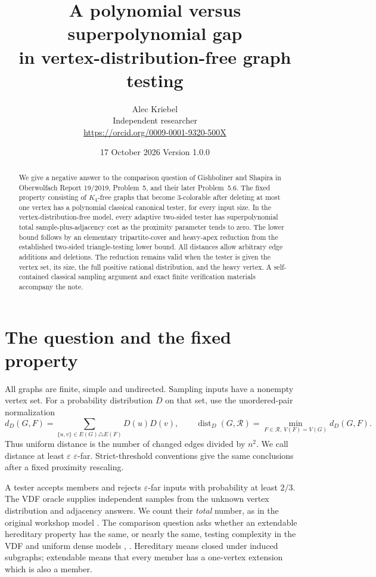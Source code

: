 \documentclass[11pt]{article}
\title{A polynomial versus superpolynomial gap\\in vertex-distribution-free graph testing}
\author{Alec Kriebel\\{\small Independent researcher}\\
{\small\url{https://orcid.org/0009-0001-9320-500X}}}
\date{17 October 2026 \quad Version 1.0.0}
\newcommand{\dist}{\operatorname{dist}}
\newcommand{\eps}{\varepsilon}
\begin{document}
\maketitle
\begin{abstract}
We give a negative answer to the comparison question of Gishboliner and
Shapira in Oberwolfach Report 19/2019, Problem~5, and their later
Problem~5.6. The fixed property consisting of $K_4$-free graphs that
become $3$-colorable after deleting at most one vertex has a polynomial
classical canonical tester, for every input size. In the
vertex-distribution-free model, every adaptive two-sided tester has
superpolynomial total sample-plus-adjacency cost as the proximity
parameter tends to zero. The lower bound follows by an elementary
tripartite-cover and heavy-apex reduction from the established two-sided
triangle-testing lower bound. All distances allow arbitrary edge
additions and deletions. The reduction remains valid when the tester is
given the vertex set, its size, the full positive rational distribution,
and the heavy vertex. A self-contained classical sampling argument and
exact finite verification materials accompany the note.
\end{abstract}

\section{The question and the fixed property}
All graphs are finite, simple and undirected. Sampling inputs have a
nonempty vertex set. For a probability distribution $D$ on that set, use
the unordered-pair normalization
\[
 d_D(G,F)=\sum_{\{u,v\}\in E(G)\triangle E(F)}D(u)D(v),
 \qquad
 \dist_D(G,\mathcal R)=\min_{F\in\mathcal R,\ V(F)=V(G)}d_D(G,F).
\]
Thus uniform distance is the number of changed edges divided by $n^2$.
We call distance at least $\eps$ $\eps$-far. Strict-threshold conventions
give the same conclusions after a fixed proximity rescaling.

A tester accepts members and rejects $\eps$-far inputs with probability
at least $2/3$. The VDF oracle supplies independent samples from the
unknown vertex distribution and adjacency answers. We count their
\emph{total} number, as in the original workshop model
\cite[p.~1138]{OWR}. The comparison question asks whether an extendable
hereditary property has the same, or nearly the same, testing complexity
in the VDF and uniform dense models \cite[Problem~5]{OWR},
\cite[Problem~5.6]{GS}. Hereditary means closed under induced subgraphs;
extendable means that every member has a one-vertex extension which is
also a member.
\end{document}
